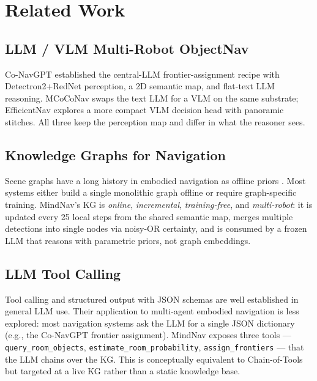 \section{Related Work}

\subsection{LLM / VLM Multi-Robot ObjectNav}
Co-NavGPT \citep{conavgpt} established the central-LLM frontier-assignment
recipe with Detectron2+RedNet perception, a 2D semantic map, and flat-text
LLM reasoning. MCoCoNav \citep{mcoconav} swaps the text LLM for a VLM on the
same substrate; EfficientNav \citep{efficientnav} explores a more compact
VLM decision head with panoramic stitches. All three keep the perception map
and differ in what the reasoner sees.

\subsection{Knowledge Graphs for Navigation}
Scene graphs have a long history in embodied navigation as offline priors
\citep{sgnav}. Most systems either build a single monolithic graph offline
or require graph-specific training. MindNav's KG is \emph{online},
\emph{incremental}, \emph{training-free}, and \emph{multi-robot}: it is
updated every 25 local steps from the shared semantic map, merges multiple
detections into single nodes via noisy-OR certainty, and is consumed by a
frozen LLM that reasons with parametric priors, not graph embeddings.

\subsection{LLM Tool Calling}
Tool calling \citep{toolformer} and structured output with JSON schemas are
well established in general LLM use. Their application to multi-agent
embodied navigation is less explored: most navigation systems ask the LLM for
a single JSON dictionary (e.g., the Co-NavGPT frontier assignment). MindNav
exposes three tools --- \texttt{query\_room\_objects},
\texttt{estimate\_room\_probability}, \texttt{assign\_frontiers} --- that the
LLM chains over the KG. This is conceptually equivalent to Chain-of-Tools
\citep{chainoftools} but targeted at a live KG rather than a static knowledge
base.
